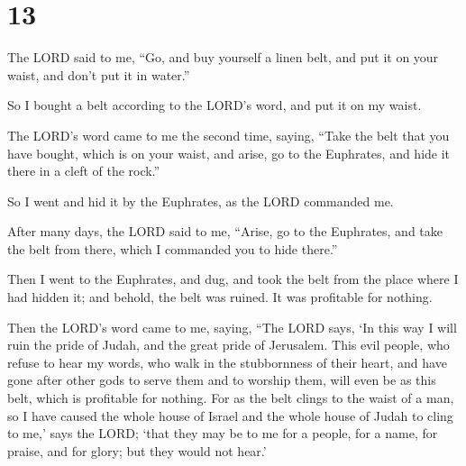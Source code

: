 \hypertarget{section-12}{%
\section{13}\label{section-12}}

 The LORD said to me, ``Go, and buy yourself a linen belt,
and put it on your waist, and don't put it in water.''

 So I bought a belt according to the LORD's word, and put
it on my waist.

 The LORD's word came to me the second time, saying,
 ``Take the belt that you have bought, which is on your
waist, and arise, go to the Euphrates, and hide it there in a cleft of
the rock.''

 So I went and hid it by the Euphrates, as the LORD
commanded me.

 After many days, the LORD said to me, ``Arise, go to the
Euphrates, and take the belt from there, which I commanded you to hide
there.''

 Then I went to the Euphrates, and dug, and took the belt
from the place where I had hidden it; and behold, the belt was ruined.
It was profitable for nothing.

 Then the LORD's word came to me, saying, 
``The LORD says, `In this way I will ruin the pride of Judah, and the
great pride of Jerusalem.  This evil people, who refuse
to hear my words, who walk in the stubbornness of their heart, and have
gone after other gods to serve them and to worship them, will even be as
this belt, which is profitable for nothing.  For as the
belt clings to the waist of a man, so I have caused the whole house of
Israel and the whole house of Judah to cling to me,' says the LORD;
`that they may be to me for a people, for a name, for praise, and for
glory; but they would not hear.'

